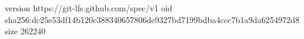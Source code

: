 version https://git-lfs.github.com/spec/v1
oid sha256:dc25e53df14b120c388340657806de9327bd7199bdba4ccc7b1a9da6254972d8
size 262240
